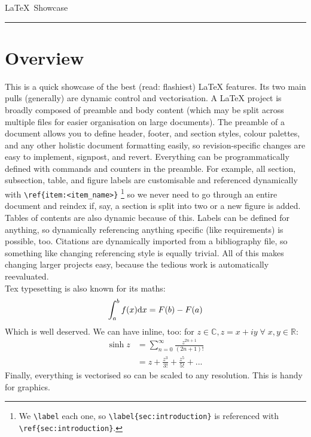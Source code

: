 \documentclass[12pt]{article}
\renewcommand{\d}[1]{\textnormal{d}#1} %
\begin{document}
\VerbatimFootnotes %

\begin{center}
  \large
  \LaTeX\ Showcase
  \vspace{0.5\headsep}
  \hrule
\end{center}

\section{Overview}

This is a quick showcase of the best (read: flashiest) LaTeX features. Its two main pulls (generally) are dynamic control and vectorisation. 
A LaTeX project is broadly composed of preamble and body content (which may be split across multiple files for easier organisation on large documents).
The preamble of a document allows you to define header, footer, and section styles, colour palettes, and any other holistic document formatting easily, so revision-specific changes are easy to implement, signpost, and revert.
Everything can be programmatically defined with commands and counters in the preamble. 
For example, all section, subsection, table, and figure labels are customisable and referenced dynamically with \verb|\ref{item:<item_name>}|
\protect\footnote{We \verb|\label| each one, so \verb|\label{sec:introduction}| is referenced with \verb|\ref{sec:introduction}|.}
so we never need to go through an entire document and reindex if, say, a section is split into two or a new figure is added. 
Tables of contents are also dynamic because of this. 
Labels can be defined for anything, so dynamically referencing anything specific (like requirements) is possible, too. 
Citations are dynamically imported from a bibliography file, so something like changing referencing style is equally trivial. 
All of this makes changing larger projects easy, because the tedious work is automatically reevaluated.
\\
Tex typesetting is also known for its maths:
\begin{equation*}
  \int_{a}^{b} f(x) \d{x} = F(b) - F(a)
\end{equation*}
Which is well deserved. We can have inline, too: for $z \in \mathbb{C}, z = x+iy \; \forall \; x, y \in \mathbb{R}$:
\begin{align*}
  \sinh z &= \sum_{n=0}^{\infty} \frac{z^{2n+1}}{(2n+1)!} \\
          &= z + \frac{z^3}{3!} + \frac{z^5}{5!} + ...
\end{align*}
Finally, everything is vectorised so can be scaled to any resolution. This is handy for graphics.
\end{document}
